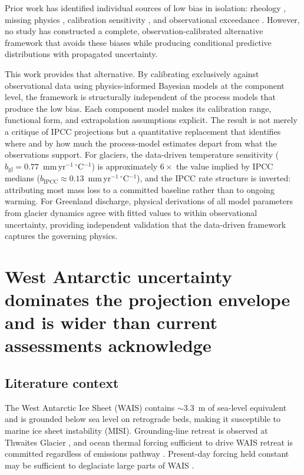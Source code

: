 \documentclass[11pt]{article}
\begin{document}
Prior work has identified individual sources of low bias in isolation: rheology \citep{Millstein2022, Martin2026}, missing physics \citep{Aschwanden2021}, calibration sensitivity \citep{Goldberg2026}, and observational exceedance \citep{Hamlington2025}. However, no study has constructed a complete, observation-calibrated alternative framework that avoids these biases while producing conditional predictive distributions with propagated uncertainty.

This work provides that alternative. By calibrating exclusively against observational data using physics-informed Bayesian models at the component level, the framework is structurally independent of the process models that produce the low bias. Each component model makes its calibration range, functional form, and extrapolation assumptions explicit. The result is not merely a critique of IPCC projections but a quantitative replacement that identifies where and by how much the process-model estimates depart from what the observations support. For glaciers, the data-driven temperature sensitivity ($b_{\mathrm{gl}} = 0.77$~mm\,yr$^{-1}$\,$^\circ$C$^{-1}$) is approximately $6\times$ the value implied by IPCC medians ($b_{\mathrm{IPCC}} \approx 0.13$~mm\,yr$^{-1}$\,$^\circ$C$^{-1}$), and the IPCC rate structure is inverted: attributing most mass loss to a committed baseline rather than to ongoing warming. For Greenland discharge, physical derivations of all model parameters from glacier dynamics agree with fitted values to within observational uncertainty, providing independent validation that the data-driven framework captures the governing physics.

\section{West Antarctic uncertainty dominates the projection envelope and is wider than current assessments acknowledge}
\label{sec:takeaway_wais}

\subsection{Literature context}

The West Antarctic Ice Sheet (WAIS) contains $\sim$3.3~m of sea-level equivalent and is grounded below sea level on retrograde beds, making it susceptible to marine ice sheet instability (MISI). Grounding-line retreat is observed at Thwaites Glacier \citep{Joughin2014}, and ocean thermal forcing sufficient to drive WAIS retreat is committed regardless of emissions pathway \citep{Naughten2023}. Present-day forcing held constant may be sufficient to deglaciate large parts of WAIS \citep{vandenAkker2025}.
\end{document}
